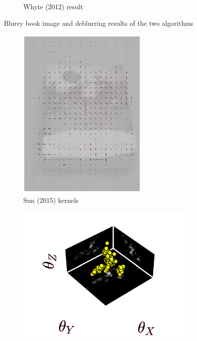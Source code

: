 \documentclass[10pt,twocolumn,letterpaper]{article}
\begin{document}
\begin{figure} [t]
\begin{center}
\begin{subfigure}{0.33\textwidth}
\caption{Whyte \etal (2012) result}
\label{fig:subim3}
\end{subfigure}
 
\caption{Blurry book image and deblurring results of the two algorithms}
\label{fig:image1}
\end{center}
\end{figure}

\begin{figure}
\begin{center}
\graphicspath{ {deblursun/} }
\begin{subfigure}{0.33\textwidth}

\includegraphics[width=0.9\linewidth]{book_kernels} 
\caption{Sun \etal (2015) kernels}
\label{fig:subim1}
\end{subfigure}
\begin{subfigure}{0.58\textwidth}
\graphicspath{ {deblurwhyte/} }
\includegraphics[width=0.9\linewidth]{book_kernel}

\end{subfigure}
\end{center}
\end{figure}
\end{document}
